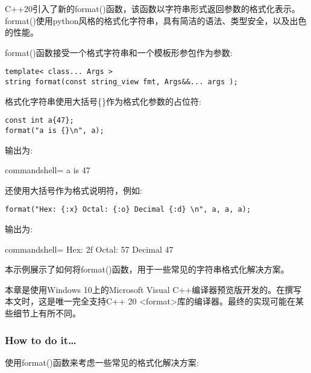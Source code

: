 
C++20引入了新的format()函数，该函数以字符串形式返回参数的格式化表示。format()使用python风格的格式化字符串，具有简洁的语法、类型安全，以及出色的性能。

format()函数接受一个格式字符串和一个模板形参包作为参数:

\begin{lstlisting}[style=styleCXX]
template< class... Args >
string format(const string_view fmt, Args&&... args );
\end{lstlisting}

格式化字符串使用大括号\{\}作为格式化参数的占位符:

\begin{lstlisting}[style=styleCXX]
const int a{47};
format("a is {}\n", a);
\end{lstlisting}

输出为:

\begin{tcblisting}{commandshell={}}
a is 47
\end{tcblisting}

还使用大括号作为格式说明符，例如:

\begin{lstlisting}[style=styleCXX]
	format("Hex: {:x} Octal: {:o} Decimal {:d} \n", a, a, a);
\end{lstlisting}

输出为:

\begin{tcblisting}{commandshell={}}
Hex: 2f Octal: 57 Decimal 47
\end{tcblisting}

本示例展示了如何将format()函数，用于一些常见的字符串格式化解决方案。

\begin{tcolorbox}[colback=webgreen!5!white,colframe=webgreen!75!black,title=Note]
本章是使用Windows 10上的Microsoft Visual C++编译器预览版开发的。在撰写本文时，这是唯一完全支持C++ 20 <format>库的编译器。最终的实现可能在某些细节上有所不同。
\end{tcolorbox}

\subsubsection{How to do it…}

使用format()函数来考虑一些常见的格式化解决方案:

